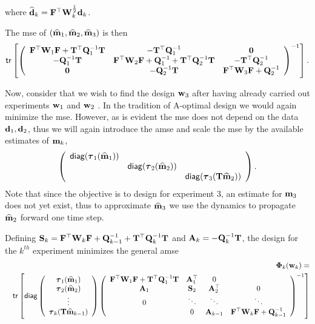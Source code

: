 \documentclass[11pt]{article}
\newcommand{\bfA}	{{\bf{A}}}
\newcommand{\bfF}	{{\bf{F}}}
\newcommand{\bfQ}	{{\bf{Q}}}
\newcommand{\bfS}	{{\bf{S}}}
\newcommand{\bfT}	{{\bf{T}}}
\newcommand{\bfW}	{{\bf{W}}}
\newcommand{\bfd}	{{\bf{d}}}
\newcommand{\bfm}	{{\bf{m}}}
\newcommand{\bfw}	{{\bf{w}}}
\newcommand{\hf}        {{\frac 12}}
\newcommand{\bfPhi}     {{\boldsymbol \Phi}}
\newcommand{\bftau}      {{\boldsymbol \tau}}
\newcommand {\zero}  { {\bf 0} }
\renewcommand{\hf}		 {\frac12}
\newcommand{\bfmhat}    {{\widehat{\bfm}}}
\newcommand{\bfdhat}    {{\widehat{\bfd}}}
\begin{document}
where $\bfdhat_k = \bfF^{\top}\bfW_k^{\hf}\bfd_k$. 

The {\sf mse} of $(\bfmhat_1,\bfmhat_2, \bfmhat_3)$ is then
\begin{equation*}
 {\sf tr}\left[\left(\begin{array}{ccc}\bfF^{\top}\bfW_1\bfF + \bfT^{\top}\bfQ^{-1}_1\bfT   & -\bfT^{\top}\bfQ^{-1}_1 & \zero\\
 -\bfQ^{-1}_1\bfT & \bfF^{\top}\bfW_2\bfF + \bfQ^{-1}_1 + \bfT^{\top}\bfQ^{-1}_2\bfT  & -\bfT^{\top}\bfQ^{-1}_2\\
 \zero & -\bfQ^{-1}_2\bfT & \bfF^{\top}\bfW_3\bfF + \bfQ^{-1}_2  
 \end{array}\right)^{-1}	\right]	.
\end{equation*}

 Now, consider that we wish to find the design $\bfw_3$ after having already carried out experiments $\bfw_1$ and  $\bfw_2$ . In the tradition of A-optimal design we would again minimize the {\sf mse}. However, as is evident  the {\sf mse} does not depend on the data $\bfd_1, \bfd_2$, thus we will again introduce the {\sf amse} and scale the {\sf mse} by the available estimates of $\bfm_{k}$, 
\begin{equation*}
 \left( \begin{array}{ccc}{\sf diag}(\bftau_1(\bfmhat_1))& & \\
  & {\sf diag}(\bftau_2(\bfmhat_2))& 
  \\& & {\sf diag}(\bftau_3(\bfT\bfmhat_2))
  \end{array}\right).
\end{equation*}
Note that since the objective is to design for experiment 3, an estimate for $\bfm_3$ does not yet exist, thus to approximate $\bfmhat_3$ we use the dynamics to propagate $\bfmhat_2$ forward one time step.

Defining $\bfS_k = \bfF^{\top}\bfW_{k}\bfF + \bfQ^{-1}_{k-1} + \bfT^{\top}\bfQ^{-1}_{k}\bfT$  and $\bfA_k = -\bfQ^{-1}_k \bfT$, the design for the $k^{th}$ experiment minimizes  the  general {\sf amse} 
\begin{eqnarray}
\label{eq:noisyPhi}
&&\bfPhi_k(\bfw_k) =\\ 
&&{\sf tr} \left[{\sf diag}\left( \begin{array}{c}
\bftau_1(\bfmhat_1) \\ 
\bftau_2(\bfmhat_2)  \\
\vdots \\
\bftau_k(\bfT\bfmhat_{k-1})\end{array}\right)
\left(\begin{array}{cccc}
  \bfF^{\top}\bfW_{1}\bfF  + \bfT^{\top}\bfQ^{-1}_{1}\bfT  &  \bfA^{\top}_1 & 0 & \\
 \bfA_1 & \bfS_2 & \bfA^{\top}_2 & 0 \\
 0 & \ddots & \ddots & \ddots \\
 & 0 & \bfA_{k-1} &  \bfF^{\top}\bfW_{k}\bfF + \bfQ^{-1}_{k-1} 
  \end{array}\right)^{-1}\right]
\end{eqnarray}
  
\end{document}
